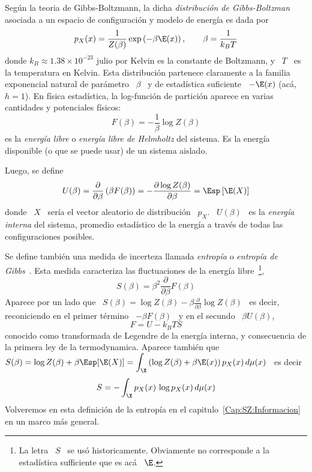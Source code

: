 \begin{ejemplo}
  Seg\'un  la  teoria  de  Gibbs-Boltzmann,  la  dicha  {\em  distribuci\'on  de
    Gibbs-Boltzman}  asociada  a  un  espacio  de configuraci\'on  y  modelo  de
  energ\'ia es dada por
  \[
  p_X(x) = \frac{1}{Z(\beta)}  \exp\left( - \beta \E(x) \right),  \qquad \beta =
  \frac{1}{k_B T}
  \]
  donde $k_B \approx  1.38 \times 10^{-23}$ julio por Kelvin  es la constante de
  Boltzmann,  y  \ $T$  \  es la  temperatura  en  Kelvin.  Esta  distribuci\'on
  partenece claramente a la familia exponencial natural de par\'ametro \ $\beta$
  \ y  de estad\'istica  suficiente \  $-\E(x)$ (ac\'a, $h  = 1$).   En f\'isica
  estad\'istica, la log-funci\'on de  partici\'on aparece en varias cantidades y
  potenciales f\'isicos:
  \[
  F(\beta) = - \frac{1}{\beta} \log Z(\beta)
  \]
  es  la  {\em  energ\'ia  libre}  o  {\em energ\'ia  libre  de  Helmholtz}  del
  sistema.  Es la  energ\'ia disponible  (o  que se  puede usar)  de un  sistema
  aislado.

  Luego, se define
  \[
  U(\beta) =  \frac{\partial}{\partial \beta} \left( \beta F(\beta)  \right) = -
  \frac{\partial \log Z(\beta)}{\partial \beta} = \Esp\left[ \E(X) \right]
  \]
  donde  \ $X$  \ ser\'ia  el  vector aleatorio  de distribuci\'on  \ $p_X$.   \
  $U(\beta)$ \ es la {\em energ\'ia interna} del sistema, promedio estad\'istico
  de la energ\'ia a trav\'es de todas las configuraciones posibles.

  Se define  tambi\'en una medida de  incerteza llamada {\em  entrop\'ia} o {\em
    entrop\'ia  de  Gibbs}~\cite{Bol77, Bol96,  Bol98,  Gib02, Jay65,  LanLif80,
    MezMon09, Mer10,  Mer18}.  Esta medida  caracteriza las fluctuaciones  de la
  energ\'ia libre~\footnote{La letra \ $S$ \ se us\'o historicamente. Obviamente
    no corresponde a la estad\'istica sufficiente que es ac\'a \ $\E$.},
  \[
  S(\beta) = \beta^2 \frac{\partial}{\partial \beta} F(\beta)
  \]
  Aparece   por   un  lado   que   \  $S(\beta)   =   \log   Z(\beta)  -   \beta
  \frac{\partial}{\partial \beta} \log Z(\beta)$  \ es decir, reconiciendo en el
  primer t\'ermino \ $- \beta F(\beta)$ \ y en el secundo \ $\beta U(\beta)$,
  \[
  F = U - k_B T S
  \]
  conocido como transformada de Legendre de la energ\'ia interna, y consecuencia
  de la  primera ley de  la termodynamica. Aparece tambi\'en  que $\displaystyle
  S(\beta) = \log Z(\beta) + \beta  \Esp[ \E(X) ] = \int_\X \left( \log Z(\beta)
    + \beta \E(x) \right) p_X(x) \, d\mu(x)$ \ es decir
  \[
  S = - \int_\X p_X(x) \, \log p_X(x) \, d\mu(x)
  \]
  Volveremos    en    esta    definici\'on    de    la    entrop\'ia    en    el
  capitulo~\ref{Cap:SZ:Informacion} en un marco m\'as general.
\end{ejemplo}


